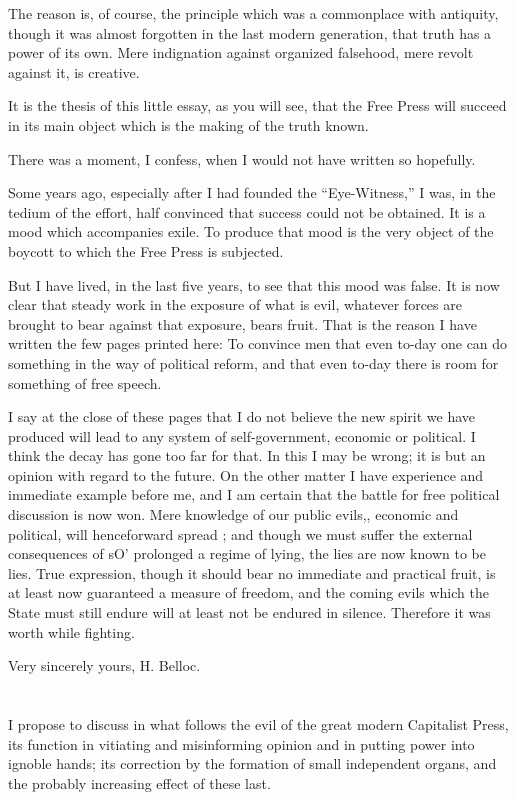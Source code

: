 \documentclass{book}
\begin{document}
The reason is, of course, the principle which was a commonplace with antiquity, though it was almost forgotten in the last modern generation, that truth has a power of its own. Mere indignation against organized falsehood, mere revolt against it, is creative.

It is the thesis of this little essay, as you will see, that the Free Press will succeed in its main object which is the making of the truth known.

There was a moment, I confess, when I would not have written so hopefully.

Some years ago, especially after I had founded the “Eye-Witness,” I was, in the tedium of the effort, half convinced that success could not be obtained. It is a mood which accompanies exile. To produce that mood is the very object of the boycott to which the Free Press is subjected.

But I have lived, in the last five years, to see that this mood was false. It is now clear that steady work in the exposure of what is evil, whatever forces are brought to bear against that exposure, bears fruit. That is the reason I have written the few pages printed here: To convince men that even to-day one can do something in the way of political reform, and that even to-day there is room for something of free speech.

I say at the close of these pages that I do not believe the new spirit we have produced will lead to any system of self-government, economic or political. I think the decay has gone too far for that. In this I may be wrong; it is but an opinion with regard to the future. On the other matter I have experience and immediate example before me, and I am certain that the battle for free political discussion is now won. Mere knowledge of our public evils,, economic and political, will henceforward spread ; and though we must suffer the external consequences of sO’ prolonged a regime of lying, the lies are now known to be lies. True expression, though it should bear no immediate and practical fruit, is at least now guaranteed a measure of freedom, and the coming evils which the State must still endure will at least not be endured in silence. Therefore it was worth while fighting.

Very sincerely yours, H. Belloc.

\chapter*{}\label{chapter-1}
I propose to discuss in what follows the evil of the great modern Capitalist Press, its function in vitiating and misinforming opinion and in putting power into ignoble hands; its correction by the formation of small independent organs, and the probably increasing effect of these last.
\end{document}
